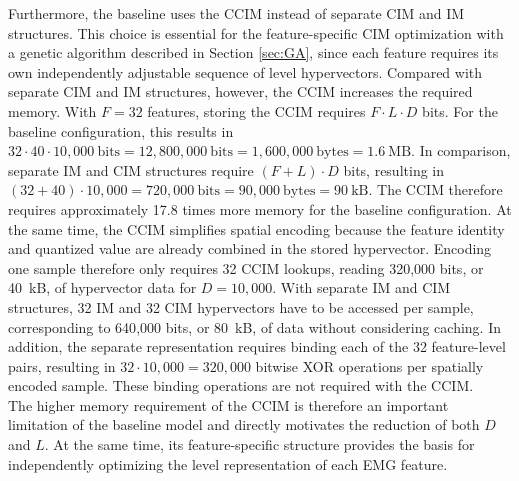    
    Furthermore, the baseline uses the \ac{CCIM} instead of separate \ac{CIM} and \ac{IM} structures. This choice is essential for the feature-specific \ac{CIM} optimization with a genetic algorithm described in Section \ref{sec:GA}, since each feature requires its own independently adjustable sequence of level hypervectors. Compared with separate \ac{CIM} and \ac{IM} structures, however, the \ac{CCIM} increases the required memory. With $F = 32$ features, storing the \ac{CCIM} requires $F\cdot L \cdot D$ bits. For the baseline configuration, this results in $32 \cdot 40 \cdot 10{,}000~\mathrm{bits}
= 12{,}800{,}000~\mathrm{bits}
= 1{,}600{,}000~\mathrm{bytes}
= 1.6~\mathrm{MB}$. In comparison, separate IM and CIM structures require $(F+L)\cdot D$ bits, resulting in $(32 + 40) \cdot 10{,}000
= 720{,}000~\mathrm{bits}
= 90{,}000~\mathrm{bytes}
= 90~\mathrm{kB}$. The CCIM therefore requires approximately 17.8 times more memory for the baseline configuration. 
    At the same time, the \ac{CCIM} simplifies spatial encoding because the feature identity and quantized value are already combined in the stored hypervector. Encoding one sample therefore only requires 32 \ac{CCIM} lookups, reading 320{,}000 bits, or 40~kB, of hypervector data for $D = 10{,}000$. With separate \ac{IM} and \ac{CIM} structures, 32 \ac{IM} and 32 \ac{CIM} hypervectors have to be accessed per sample, corresponding to 640{,}000 bits, or 80~kB, of data without considering caching. In addition, the separate representation requires binding each of the 32 feature-level pairs, resulting in $32 \cdot 10{,}000 = 320{,}000$ bitwise XOR operations per spatially encoded sample. These binding operations are not required with the CCIM.\\

    The higher memory requirement of the CCIM is therefore an important limitation of the baseline model and directly motivates the reduction of both $D$ and $L$. At the same time, its feature-specific structure provides the basis for independently optimizing the level representation of each EMG feature.
